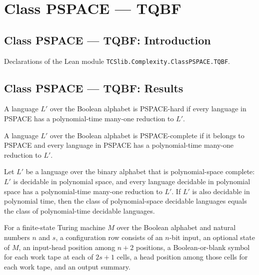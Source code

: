 \section{Class PSPACE --- TQBF}
\subsection*{Class PSPACE --- TQBF: Introduction}

Declarations of the Lean module \texttt{TCSlib.Complexity.ClassPSPACE.TQBF}.

\subsection*{Class PSPACE --- TQBF: Results}

\begin{definition}
\label{Complexity.PSPACEHard}
\leanok
{}
A language $L'$ over the Boolean alphabet is PSPACE-hard if every language in PSPACE has
a polynomial-time many-one reduction to $L'$.
\end{definition}

\begin{definition}
\label{Complexity.PSPACEComplete}
\leanok
{}
A language $L'$ over the Boolean alphabet is PSPACE-complete if it belongs to PSPACE and
every language in PSPACE has a polynomial-time many-one reduction to $L'$.
\end{definition}

\begin{theorem}
\label{Complexity.PSPACE_eq_P_of_pspaceComplete_mem_P}
\leanok
{}
Let $L'$ be a language over the binary alphabet that is polynomial-space complete: $L'$
is decidable in polynomial space, and every language decidable in polynomial space has a
polynomial-time many-one reduction to $L'$. If $L'$ is also decidable in polynomial
time, then the class of polynomial-space decidable languages equals the class of
polynomial-time decidable languages.
\end{theorem}

\begin{definition}
\label{Complexity.CodecRow}
\leanok
{}
For a finite-state Turing machine $M$ over the Boolean alphabet and natural numbers $n$
and $s$, a configuration row consists of an $n$-bit input, an optional state of $M$, an
input-head position among $n+2$ positions, a Boolean-or-blank symbol for each work tape
at each of $2s+1$ cells, a head position among those cells for each work tape, and an
output summary.
\end{definition}

